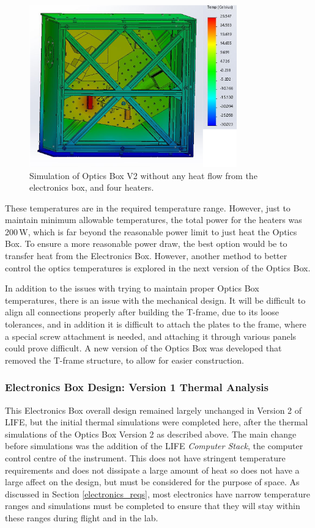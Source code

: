 \begin{figure}
    \centering
    \includegraphics[width=0.8\textwidth]{chap3_images/LIFE_V2_images/TA_-30_no_front_wall_four_heaters_FIXED.png}
    \caption{Simulation of Optics Box V2 without any heat flow from the electronics box, and four heaters.}
    \label{fig:OB_V2_TA_4_4HEATERS}
\end{figure}

These temperatures are in the required temperature range. However, just to maintain minimum allowable temperatures, the total power for the heaters was 200\,W, which is far beyond the reasonable power limit to just heat the Optics Box. To ensure a more reasonable power draw, the best option would be to transfer heat from the Electronics Box. However, another method to better control the optics temperatures is explored in the next version of the Optics Box.

In addition to the issues with trying to maintain proper Optics Box temperatures, there is an issue with the mechanical design. It will be difficult to align all connections properly after building the T-frame, due to its loose tolerances, and in addition it is difficult to attach the plates to the frame, where a special screw attachment is needed, and attaching it through various panels could prove difficult. A new version of the Optics Box was developed that removed the T-frame structure, to allow for easier construction.

\subsubsection{Electronics Box Design: Version 1 Thermal Analysis}
This Electronics Box overall design remained largely unchanged in Version 2 of LIFE, but the initial thermal simulations were completed here, after the thermal simulations of the Optics Box Version 2 as described above. The main change before simulations was the addition of the LIFE \textit{Computer Stack}, the computer control centre of the instrument. This does not have stringent temperature requirements and does not dissipate a large amount of heat so does not have a large affect on the design, but must be considered for the purpose of space. As discussed in Section \ref{electronics_reqs}, most electronics have narrow temperature ranges and simulations must be completed to ensure that they will stay within these ranges during flight and in the lab.

